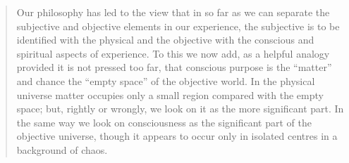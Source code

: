 \begin{quote}
    Our philosophy has led to the view that in so far as we can separate the subjective and objective elements in our experience, the subjective is to be identified with the physical and the objective with the conscious and spiritual aspects of experience.  To this we now add, as a helpful analogy provided it is not pressed too far, that conscious purpose is the ``matter'' and chance the ``empty space'' of the objective world.  In the physical universe matter occupies only a small region compared with the empty space; but, rightly or wrongly, we look on it as the more significant part.  In the same way we look on consciousness as the significant part of the objective universe, though it appears to occur only in isolated centres in a background of chaos.  \citep[p. 180-184]{Eddington1939}
\end{quote}

























